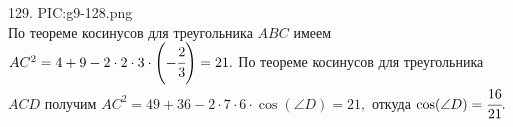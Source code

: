 129. {{PIC:g9-128.png}}\\
По теореме косинусов для треугольника $ABC$ имеем $AC^2=4+9-2\cdot2\cdot3\cdot\left(-\cfrac{2}{3}\right)=21.$ По теореме косинусов для треугольника $ACD$ получим $AC^2=49+36-2\cdot7\cdot6\cdot \cos(\angle D)=21,$ откуда $\cos(\angle D)=\cfrac{16}{21}.$\\
